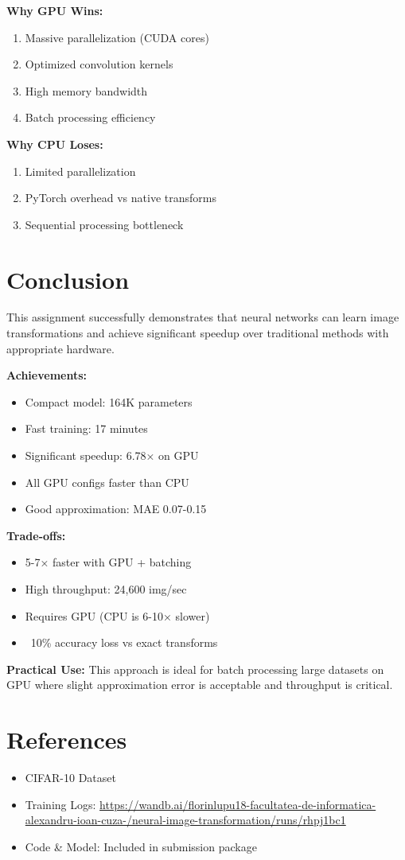 \documentclass[11pt,a4paper]{article}
\begin{document}
\textbf{Why GPU Wins:}
\begin{enumerate}
    \item Massive parallelization (CUDA cores)
    \item Optimized convolution kernels
    \item High memory bandwidth
    \item Batch processing efficiency
\end{enumerate}

\textbf{Why CPU Loses:}
\begin{enumerate}
    \item Limited parallelization
    \item PyTorch overhead vs native transforms
    \item Sequential processing bottleneck
\end{enumerate}

\section{Conclusion}

This assignment successfully demonstrates that neural networks can learn image transformations and achieve significant speedup over traditional methods with appropriate hardware.

\textbf{Achievements:}
\begin{itemize}
    \item  Compact model: 164K parameters
    \item  Fast training: 17 minutes
    \item  Significant speedup: 6.78× on GPU
    \item  All GPU configs faster than CPU
    \item  Good approximation: MAE 0.07-0.15
\end{itemize}

\textbf{Trade-offs:}
\begin{itemize}
    \item  5-7× faster with GPU + batching
    \item  High throughput: 24,600 img/sec
    \item  Requires GPU (CPU is 6-10× slower)
    \item  ~10\% accuracy loss vs exact transforms
\end{itemize}

\textbf{Practical Use:} This approach is ideal for batch processing large datasets on GPU where slight approximation error is acceptable and throughput is critical.

\section*{References}

\begin{itemize}
    \item CIFAR-10 Dataset
    \item Training Logs: \url{https://wandb.ai/florinlupu18-facultatea-de-informatica-alexandru-ioan-cuza-/neural-image-transformation/runs/rhpj1bc1}
    \item Code \& Model: Included in submission package
\end{itemize}
\end{document}
